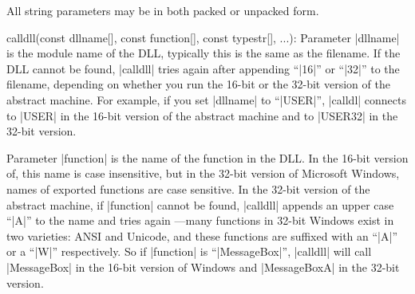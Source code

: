 All string parameters may be in both packed or unpacked form.

\beginlist{35pt}
\item calldll(const dllname[], const function[], const typestr[], ...):
  Parameter |dllname| is the module name of the DLL, typically this is the same
  as the filename. If the DLL cannot be found, |calldll| tries again after
  appending ``|16|'' or ``|32|'' to the filename, depending on whether you run
  the 16-bit or the 32-bit version of the abstract machine. For example, if
  you set |dllname| to ``|USER|'', |calldl| connects to |USER| in the 16-bit
  version of the abstract machine and to |USER32| in the 32-bit version.

  Parameter |function| is the name of the function in the DLL. In the 16-bit
  version of, this name is case insensitive, but in the 32-bit version of
  Microsoft Windows, names of exported functions are case sensitive. In the
  32-bit version of the abstract machine, if |function| cannot be found,
  |calldll| appends an upper case ``|A|'' to the name and tries again ---many
  functions in 32-bit Windows exist in two varieties: ANSI and Unicode, and
  these functions are suffixed with an ``|A|'' or a ``|W|'' respectively. So
  if |function| is ``|MessageBox|'', |calldll| will call |MessageBox| in the
  16-bit version of Windows and |MessageBoxA| in the 32-bit version.

